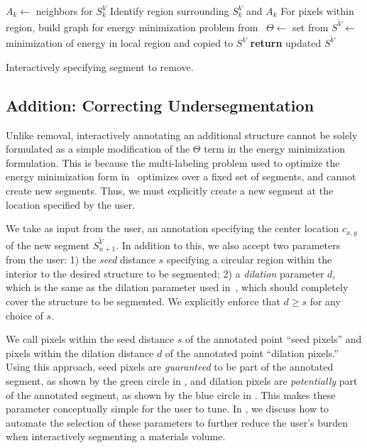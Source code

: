 \documentclass[]{spie}  %
\begin{document}
\begin{algorithm}[!t]
  \centering
  \algrenewcommand{}
  \begin{algorithmic}[1]
    \State $A_k \gets$ neighbors for $S^V_k$
    \State Identify region surrounding $S^V_k$ and $A_k$
    \State For pixels within region, build graph for energy minimization problem from~\cite{waggoner:11}
    \State $\Theta \gets $ set from 
    \State $ S^{\tilde{V}} \gets $ minimization of energy in local region and copied to $S^V$
    \State \textbf{return} updated $S^{\tilde{V}}$
    \EndFunction
  \end{algorithmic}
  \caption{Interactively specifying segment to remove.}
  \label{alg:remove}
\end{algorithm}

\subsection{Addition: Correcting Undersegmentation}
\label{sec:addition}

Unlike removal, interactively annotating an additional structure
cannot be solely formulated as a simple modification of the $\Theta$
term in the energy minimization formulation.  This is because the
multi-labeling problem used to optimize the energy minimization form
in~\cite{waggoner:11} optimizes over a fixed set of segments, and
cannot create new segments.  Thus, we must explicitly create a new
segment at the location specified by the user.

We take as input from the user, an annotation specifying the center
location $c_{x,y}$ of the new segment $S^{\tilde{V}}_{n+1}$.  In
addition to this, we also accept two parameters from the user: 1) the
\emph{seed} distance $s$ specifying a circular region within the
interior to the desired structure to be segmented; 2) a
\textit{dilation} parameter $d$, which is the same as the dilation
parameter used in~\cite{waggoner:11}, which should completely cover
the structure to be segmented.  We explicitly enforce that $d \geq s$
for any choice of $s$.

We call pixels within the seed distance $s$ of the annotated point
``seed pixels'' and pixels within the dilation distance $d$ of the
annotated point ``dilation pixels.''  Using this approach, seed pixels
are \emph{guaranteed} to be part of the annotated segment, as shown by
the green circle in , and dilation pixels are
\emph{potentially} part of the annotated segment, as shown by the blue
circle in .  This makes these parameter
conceptually simple for the user to tune.  In , we discuss
how to automate the selection of these parameters to further reduce
the user's burden when interactively segmenting a materials volume.
\end{document}
